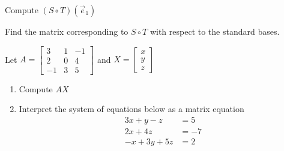 \begin{applicationActivities}{1}{21}
\begin{activity}{0}
  Compute $(S \circ T)(\vec{e}_1)$
\end{activity}

\begin{activity}{0}
  Find the matrix corresponding to $S \circ T$ with respect to the standard bases.
\end{activity}

\begin{activity}{0}
Let $A=\begin{bmatrix} 3 & 1 & -1 \\ 2 & 0 & 4 \\ -1 & 3 & 5 \end{bmatrix}$ and $X=\begin{bmatrix} x \\ y \\ z \end{bmatrix}$
\begin{enumerate}
\item Compute $AX$
\item Interpret the system of equations below as a matrix equation
\begin{align*}
3x+y-z &= 5 \\ 2x+4z &= -7 \\ -x+3y+5z &=2
\end{align*}
\end{enumerate}
\end{activity}

\end{applicationActivities}
